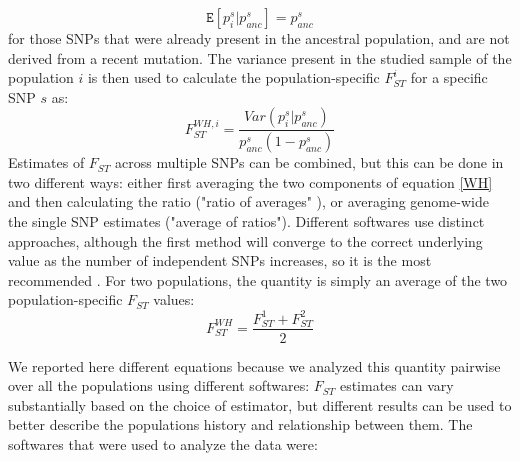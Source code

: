 \documentclass[a4paper, 12pt]{report}
\begin{document}
\begin{description}
	\begin{equation}
		\mathtt{E}[p_i^s | p_{anc}^s] = p_{anc}^s
	\end{equation} 
	for those SNPs that were already present in the ancestral population, and are not derived from a recent mutation. The variance present in the studied sample of the population $i$ is then used to calculate the population-specific $F_{ST}^i$ for a specific SNP $s$ as:
	\begin{equation}\label{WH}
		F_{ST}^{WH, i} =  \dfrac{Var(p_i^s | p_{anc}^s)}{p_{anc}^s(1-p_{anc}^s)}
	\end{equation}
	Estimates of $F_{ST}$ across multiple SNPs can be combined, but this can be done in two different ways: either first averaging the two components of equation \ref{WH} and then calculating the ratio ("ratio of averages" \parencite{bhatiaEstimatingInterpretingFST2013}), or averaging genome-wide the single SNP estimates ("average of ratios"). Different softwares use distinct approaches, although the first method will converge to the correct underlying value as the number of independent SNPs increases, so it is the most recommended \parencite{bhatiaEstimatingInterpretingFST2013}.
	For two populations, the quantity is simply an average of the two population-specific $F_{ST}$ values:
	\begin{equation}
		F_{ST}^{WH} = \dfrac{F_{ST}^1+F_{ST}^2}{2}
	\end{equation}
\end{description}
\vspace{-0.5em}
We reported here different equations because we analyzed this quantity pairwise over all the populations using different softwares: $F_{ST}$ estimates can vary substantially based on the choice of estimator, but different results can be used to better describe the populations history and relationship between them. The softwares that were used to analyze the data were:
\vspace{-1.5em}
\end{document}
